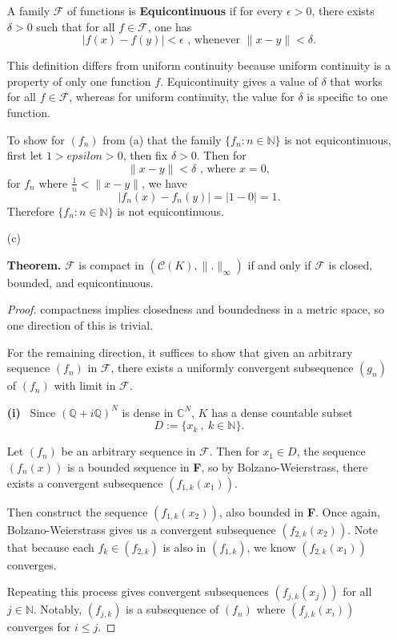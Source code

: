\documentclass[12pt]{amsart}
\newcommand{\N}{\mathbb{N}}
\newcommand{\Q}{\mathbb{Q}}
\newcommand{\C}{\mathbb{C}}
\newcommand{\eq}[1]{\begin{equation*}#1\end{equation*}}
\newcommand{\<}{\langle}
\renewcommand{\>}{\rangle}
\renewcommand{\-}[1]{\overline{#1}}
\begin{document}
\begin{itemize}
    A family $\mathcal{F}$ of functions is \textbf{Equicontinuous} if for every $\epsilon > 0$, there exists $\delta > 0$ such that for all $f \in \mathcal{F}$, one has 
    \eq{|f(x) - f(y)| < \epsilon \text{ , whenever } \|x - y\| < \delta.}

    This definition differs from uniform continuity because uniform continuity is a property of only one function $f$. Equicontinuity gives a value of $\delta$ that works for all $f \in \mathcal{F}$, whereas for uniform continuity, the value for $\delta$ is specific to one function.

    To show for $(f_n)$ from (a) that the family $\{f_n : n \in \N\}$ is not equicontinuous, first let $1 > epsilon > 0$, then fix $\delta > 0$. Then for 
    \eq{\|x - y \| < \delta \text{ , where } x = 0,}
    for $f_n$ where $\frac{1}{n} < \|x - y\|$, we have 
    \eq{|f_n(x) - f_n(y)| = |1 - 0| = 1.}
    Therefore $\{f_n : n \in \N\}$ is not equicontinuous.

    \item [(c)]
    
        \textbf{Theorem.} $\mathcal{F}$ is compact in $(\mathcal{C}(K), \|.\|_\infty)$ if and only if $\mathcal{F}$ is closed, bounded, and equicontinuous.

        \begin{proof}
            compactness implies closedness and boundedness in a metric space, so one direction of this is trivial.

            For the remaining direction, it suffices to show that given an arbitrary sequence $(f_n)$ in $\mathcal{F}$, there exists a uniformly convergent subsequence $(g_n)$ of $(f_n)$ with limit in $\mathcal{F}$.

            \textbf{(i)} ~Since $(\Q + i\Q)^N$ is dense in $\C^N$, $K$ has a dense countable subset \eq{D := \{x_k~,~ k \in \N\}.}
            
            Let $(f_n)$ be an arbitrary sequence in $\mathcal{F}$. Then for $x_1 \in D$, the sequence $(f_n(x))$ is a bounded sequence in \textbf{F}, so by Bolzano-Weierstrass, there exists a convergent subsequence $(f_{1, k}(x_1))$.

            Then construct the sequence $(f_{1, k}(x_2))$, also bounded in \textbf{F}. Once again, Bolzano-Weierstrass gives us a convergent subsequence $(f_{2, k}(x_2))$. Note that because each $f_k \in (f_{2, k})$ is also in $(f_{1,k})$, we know $(f_{2, k} (x_1))$ converges.

            Repeating this process gives convergent subsequences $(f_{j,k}(x_j))$ for all $j \in \N$. Notably, $(f_{j,k})$ is a subsequence of $(f_n)$ where $(f_{j, k}(x_i))$ converges for $i \leq j$.


\end{proof}
\end{itemize}
\end{document}
